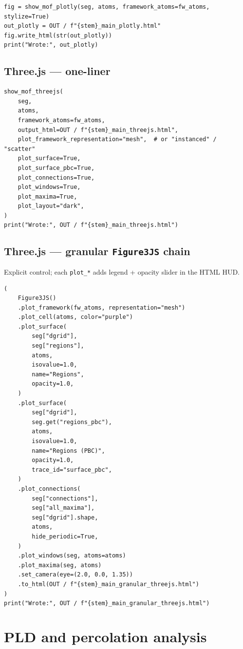 \documentclass[11pt]{article}
\begin{document}
\begin{verbatim}
fig = show_mof_plotly(seg, atoms, framework_atoms=fw_atoms, stylize=True)
out_plotly = OUT / f"{stem}_main_plotly.html"
fig.write_html(str(out_plotly))
print("Wrote:", out_plotly)
\end{verbatim}
\subsection{Three.js — one-liner}
\label{sec:orgf374806}

\begin{verbatim}
show_mof_threejs(
    seg,
    atoms,
    framework_atoms=fw_atoms,
    output_html=OUT / f"{stem}_main_threejs.html",
    plot_framework_representation="mesh",  # or "instanced" / "scatter"
    plot_surface=True,
    plot_surface_pbc=True,
    plot_connections=True,
    plot_windows=True,
    plot_maxima=True,
    plot_layout="dark",
)
print("Wrote:", OUT / f"{stem}_main_threejs.html")
\end{verbatim}
\subsection{Three.js — granular \texttt{Figure3JS} chain}
\label{sec:orgd81109f}

Explicit control; each \texttt{plot\_*} adds legend + opacity slider in the HTML HUD.

\begin{verbatim}
(
    Figure3JS()
    .plot_framework(fw_atoms, representation="mesh")
    .plot_cell(atoms, color="purple")
    .plot_surface(
        seg["dgrid"],
        seg["regions"],
        atoms,
        isovalue=1.0,
        name="Regions",
        opacity=1.0,
    )
    .plot_surface(
        seg["dgrid"],
        seg.get("regions_pbc"),
        atoms,
        isovalue=1.0,
        name="Regions (PBC)",
        opacity=1.0,
        trace_id="surface_pbc",
    )
    .plot_connections(
        seg["connections"],
        seg["all_maxima"],
        seg["dgrid"].shape,
        atoms,
        hide_periodic=True,
    )
    .plot_windows(seg, atoms=atoms)
    .plot_maxima(seg, atoms)
    .set_camera(eye=(2.0, 0.0, 1.35))
    .to_html(OUT / f"{stem}_main_granular_threejs.html")
)
print("Wrote:", OUT / f"{stem}_main_granular_threejs.html")
\end{verbatim}
\section{PLD and percolation analysis}
\label{sec:orgd5fa988}
\end{document}
